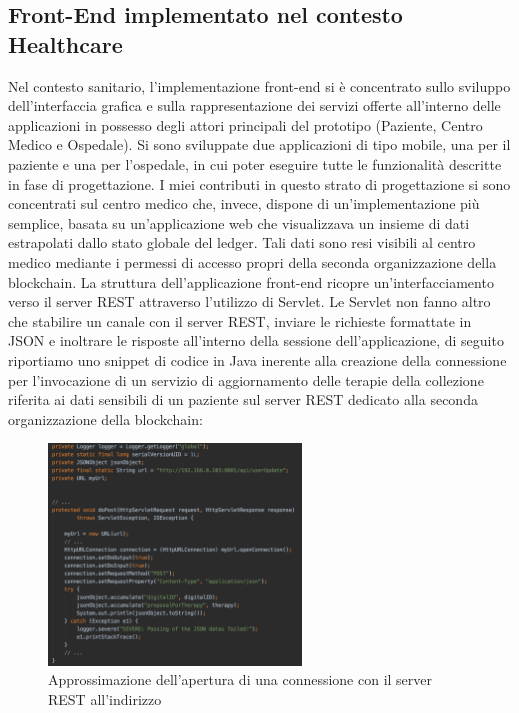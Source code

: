 \subsection{Front-End implementato nel contesto Healthcare}
Nel contesto sanitario, l'implementazione front-end si è concentrato sullo sviluppo dell'interfaccia grafica e sulla rappresentazione dei servizi offerte all'interno delle applicazioni in possesso degli attori principali del prototipo (Paziente, Centro Medico e Ospedale). Si sono sviluppate due applicazioni di tipo mobile, una per il paziente e una per l'ospedale, in cui poter eseguire tutte le funzionalità descritte in fase di progettazione. I miei contributi in questo strato di progettazione si sono concentrati sul centro medico che, invece, dispone di un'implementazione più semplice, basata su un'applicazione web che visualizzava un insieme di dati estrapolati dallo stato globale del ledger. Tali dati sono resi visibili al centro medico mediante i permessi di accesso propri della seconda organizzazione della blockchain. La struttura dell'applicazione front-end ricopre un'interfacciamento verso il server REST attraverso l'utilizzo di Servlet. Le Servlet non fanno altro che stabilire un canale con il server REST, inviare le richieste formattate in JSON e inoltrare le risposte all'interno della sessione dell'applicazione, di seguito riportiamo uno snippet di codice in Java inerente alla creazione della connessione per l'invocazione di un servizio di aggiornamento delle terapie della collezione riferita ai dati sensibili di un paziente sul server REST dedicato alla seconda organizzazione della blockchain:
\begin{figure}[h]
    \centering
    \includegraphics[width=0.6\textwidth]{img/connection_healthcare.png}
    \caption{Approssimazione dell'apertura di una connessione con il server REST all'indirizzo}
    \label{fig:connection_healthcare}
\end{figure}
